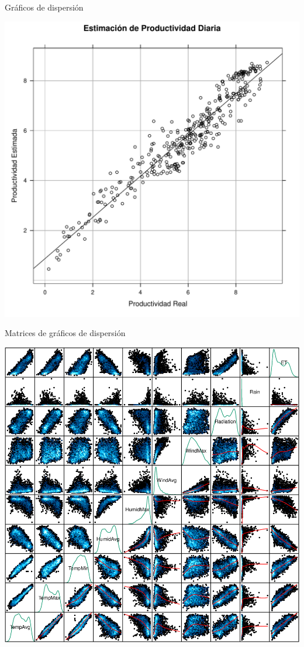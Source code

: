 \documentclass[xcolor={usenames,svgnames,dvipsnames}]{beamer}
\begin{document}
\begin{frame}[label={sec:orgd6a9b19}]{Gráficos de dispersión}
\begin{center}
\includegraphics[width=.9\linewidth]{../figs/GraficoDispersion.pdf}
\end{center}
\end{frame}


\begin{frame}[label={sec:org066072e}]{Matrices de gráficos de dispersión}
\begin{center}
\includegraphics[height=0.9\textheight]{../figs/Splom.png}
\end{center}
\end{frame}
\end{document}
